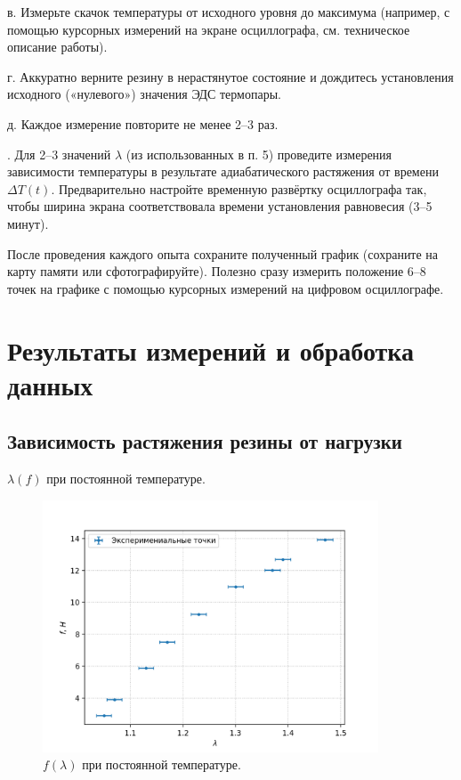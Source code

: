 \documentclass[a4paper,12pt]{article} %
\begin{document}
    в. Измерьте скачок температуры от исходного уровня до максимума (например, с помощью курсорных измерений на экране осциллографа, см. техническое описание работы).

    г. Аккуратно верните резину в нерастянутое состояние и дождитесь установления исходного («нулевого») значения ЭДС термопары.

    д. Каждое измерение повторите не менее 2–3 раз.
\smallskip

. Для 2–3 значений $\lambda$ (из использованных в п. 5) проведите измерения зависимости температуры в результате адиабатического растяжения от времени $\Delta T(t)$. Предварительно настройте временную развёртку осциллографа так, чтобы ширина экрана соответствовала времени установления равновесия (3–5 минут).

    После проведения каждого опыта сохраните полученный график (сохраните на карту памяти или сфотографируйте). Полезно сразу измерить положение 6–8 точек на графике с помощью курсорных измерений на цифровом осциллографе.

\section{Результаты измерений и обработка данных}

\subsection*{Зависимость растяжения резины от нагрузки}

\begin{table}[h!]

\caption{$\lambda(f)$ при постоянной температуре.}
\end{table}

\begin{figure}[h!]
\begin{center}
\includegraphics[width=0.89\textwidth]{f(lambda).png}
\caption{$f(\lambda)$ при постоянной температуре.}
\end{center}
\end{figure}
\end{document}
